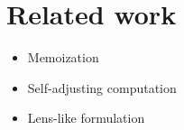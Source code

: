 \clearpage
\section{Related work}\label{sec-related}

\begin{itemize}
    \item Memoization
    \item Self-adjusting computation
    \item Lens-like formulation
\end{itemize}
